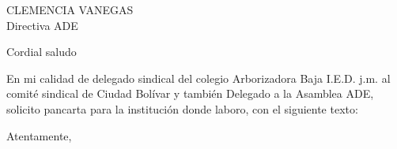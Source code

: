 \documentclass[letterpaper,spanish,11pt]{letter}
\begin{document}
\begin{letter}{CLEMENCIA VANEGAS\\Directiva ADE}
	
\opening{Cordial saludo}
En mi calidad de delegado sindical del colegio Arborizadora Baja  I.E.D. j.m. al comité sindical de Ciudad Bolívar y también Delegado a la Asamblea ADE, solicito pancarta para la institución donde laboro, con el siguiente texto:\\

\closing{Atentamente,}


\end{letter}
\end{document}

